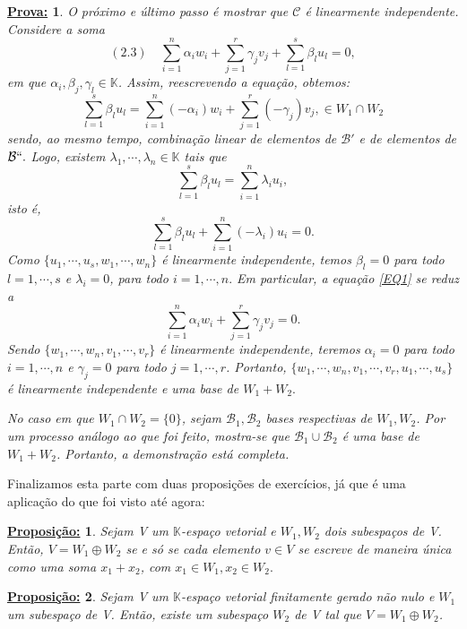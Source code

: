 \documentclass{article}
\newtheorem*{proposition*}{\underline{Proposi\c c\~ao:}}
\newtheorem*{proof*}{\underline{Prova:}}
\begin{document}
\begin{proof*}
	O pr\'oximo e \'ultimo passo \'e mostrar que $\mathcal{C}$ \'e linearmente independente. Considere a soma
	$$
		(2.3)\quad\sum_{i=1}^{n}\alpha_{i}w_{i} + \sum_{j=1}^{r}\gamma_{j}v_{j} + \sum_{l=1}^{s}\beta_{l}u_{l} = 0, \label{EQ1}
	$$
	em que $\alpha_{i}, \beta_{j}, \gamma_{l}\in\mathbb{K}$. Assim, reescrevendo a equa\c c\~ao, obtemos:
	$$
		\sum_{l=1}^{s}\beta_{l}u_{l} = \sum_{i=1}^{n}(-\alpha_{i})w_{i} + \sum_{j=1}^{r}(-\gamma_{j})v_{j}, \in{W_1\cap{W_2}}
	$$
	sendo, ao mesmo tempo, combina\c c\~ao linear de elementos de $\mathcal{B'}$ e de elementos de $\mathcal{B``}.$
	Logo, existem $\lambda_1, \cdots, \lambda_n\in\mathbb{K}$ tais que
	$$
		\sum_{l=1}^{s}\beta_{l}u_{l} = \sum_{i=1}^{n}\lambda_{i}u_{i},
	$$
	isto \'e,
	$$
		\sum_{l=1}^{s}\beta_{l}u_{l} + \sum_{i=1}^{n}(-\lambda_{i})u_{i} = 0.
	$$
	Como $\{u_1, \cdots, u_s, w_1, \cdots, w_n\}$ \'e linearmente independente, temos $\beta_l = 0$ para todo
	$l = 1, \cdots, s$ e $\lambda_i = 0$, para todo $i = 1, \cdots, n.$ Em particular, a equa\c c\~ao \ref{EQ1} se reduz
	a
	$$
		\sum_{i=1}^{n}\alpha_{i}w_{i} + \sum_{j=1}^{r}\gamma_{j}v_{j} = 0.
	$$
	Sendo $\{w_1, \cdots, w_n, v_1, \cdots, v_r\}$ \'e linearmente independente, teremos $\alpha_{i} = 0$ para todo
	$i = 1, \cdots, n$ e $\gamma_{j} = 0$ para todo $j = 1, \cdots, r$. Portanto, $\{w_1, \cdots, w_n, v_1, \cdots, v_r, u_1,
		\cdots, u_s\}$ \'e linearmente independente e uma base de $W_1 + W_2.$

	No caso em que $W_1\cap{W_2} = \{0\}$, sejam $\mathcal{B_1}, \mathcal{B_2}$ bases respectivas de $W_1, W_2$. Por um
	processo an\'alogo ao que foi feito, mostra-se que $\mathcal{B_1}\cup\mathcal{B_2}$ \'e uma base de $W_1 + W_2$.
	Portanto, a demonstra\c c\~ao est\'a completa.

\end{proof*}
Finalizamos esta parte com duas proposi\c c\~oes de exerc\'icios, j\'a que \'e uma aplica\c c\~ao do que foi visto
at\'e agora:
\begin{proposition*}
	Sejam V um $\mathbb{K}$-espa\c co vetorial e $W_1, W_2$ dois subespa\c cos de V. Ent\~ao, $V = W_1 \oplus W_2$ se e
	s\'o se cada elemento $v\in{V}$ se escreve de maneira \'unica como uma soma $x_1 + x_2$, com $x_1\in{W_1}, x_2\in{W_2}.$
\end{proposition*}
\begin{proposition*}
	Sejam V um $\mathbb{K}$-espa\c co vetorial finitamente gerado n\~ao nulo e $W_1$ um subespa\c co de V. Ent\~ao,
	existe um subespa\c co $W_2$ de V tal que $V = W_1 \oplus W_2$.
\end{proposition*}
\end{document}
